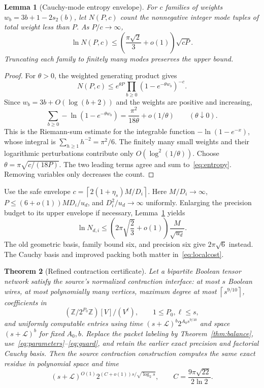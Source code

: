 \documentclass[11pt,letterpaper]{article}
\numberwithin{equation}{section}
\newtheorem{theorem}{Theorem}[section]
\newtheorem{lemma}[theorem]{Lemma}
\theoremstyle{definition}\newtheorem{definition}[theorem]{Definition}
\theoremstyle{remark}\newtheorem{remark}[theorem]{Remark}
\newcommand{\ceil}[1]{\left\lceil #1\right\rceil}
\newcommand{\LL}{\mathcal L}
\begin{document}
\begin{lemma}[Cauchy-mode entropy envelope]\label{lem:entropy}
For $c$ families of weights $w_b=3b+1-2s_2(b)$, let $N(P,c)$ count the nonnegative integer mode tuples of total weight less than $P$. As $P/c\to\infty$,
\begin{equation}\label{eq:entropy}
 \ln N(P,c)\le
 \left(\frac{\pi\sqrt2}{3}+o(1)\right)\sqrt{cP}.
\end{equation}
Truncating each family to finitely many modes preserves the upper bound.
\end{lemma}

\begin{proof}
For $\theta>0$, the weighted generating product gives
\[
 N(P,c)\le e^{\theta P}
       \prod_{b\ge0}(1-e^{-\theta w_b})^{-c}.
\]
Since $w_b=3b+O(\log(b+2))$ and the weights are positive and increasing,
\[
 \sum_{b\ge0}-\ln(1-e^{-\theta w_b})
      =\frac{\pi^2}{18\theta}+o(1/\theta)
      \qquad(\theta\downarrow0).
\]
This is the Riemann-sum estimate for the integrable function $-\ln(1-e^{-x})$, whose integral is $\sum_{h\ge1}h^{-2}=\pi^2/6$. The finitely many small weights and their logarithmic perturbations contribute only $O(\log^2(1/\theta))$. Choose $\theta=\pi\sqrt{c/(18P)}$. The two leading terms agree and sum to~\eqref{eq:entropy}. Removing variables only decreases the count.
\end{proof}

Use the safe envelope $c=\ceil{2(1+\eta_s)M/D_i}$. Here $M/D_i\to\infty$, $P\le(6+o(1))MD_i/u_d$, and $D_i^2/u_d\to\infty$ uniformly. Enlarging the precision budget to its upper envelope if necessary, Lemma~\ref{lem:entropy} yields
\begin{equation}\label{eq:localcost}
 \ln N_{d,i}\le
 \left(2\pi\sqrt{\frac23}+o(1)\right)\frac{M}{\sqrt{u_d}}.
\end{equation}
The old geometric basis, family bound six, and precision six give $2\pi\sqrt6$ instead. The Cauchy basis and improved packing both matter in~\eqref{eq:localcost}.

\begin{theorem}[Refined contraction certificate]\label{thm:main}
Let a bipartite Boolean tensor network satisfy the source's normalized contraction interface: at most $s$ Boolean wires, at most polynomially many vertices, maximum degree at most $\ceil{s^{9/10}}$, coefficients in
\[
 (\mathbb Z/2^{P_0}\mathbb Z)[V]/(V^\ell),\qquad 1\le P_0,\ell\le s,
\]
and uniformly computable entries using time $(s+\LL)^b2^{A_0s^{9/10}}$ and space $(s+\LL)^b$ for fixed $A_0,b$. Replace the packet labeling by Theorem~\ref{thm:balance}, use~\eqref{eq:parameters}--\eqref{eq:guard}, and retain the earlier exact precision and factorial Cauchy basis. Then the source contraction construction computes the same exact residue in polynomial space and time
\begin{equation}\label{eq:finaltime}
 (s+\LL)^{O(1)}2^{(C+o(1))s/\sqrt{\log_2 s}},
 \qquad C=\frac{9\pi\sqrt{22}}{2\ln2}.
\end{equation}
\end{theorem}
\end{document}
